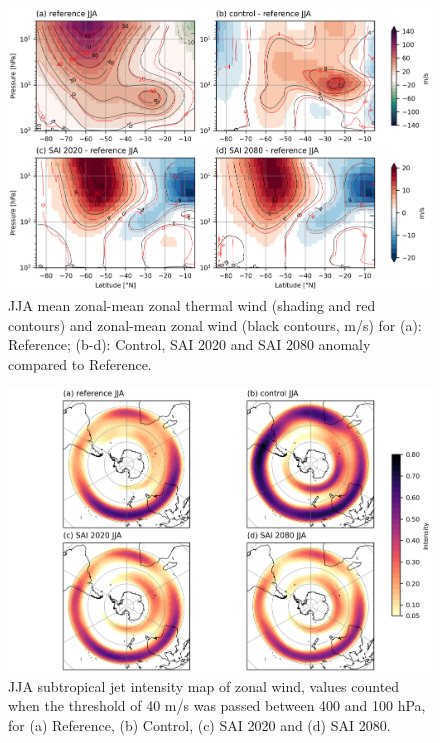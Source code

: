 \begin{figure}[H]
	\centering
	\includegraphics[width=0.95\linewidth]{images/UT_U_zmdiff_JJA.png}
	\caption{JJA mean zonal-mean zonal thermal wind (shading and red contours) and zonal-mean zonal wind (black contours, m/s) for (a): Reference; (b-d): Control, SAI 2020 and SAI 2080 anomaly compared to Reference.}
	\label{fig:UT_U_zmdiff_JJA}
\end{figure}


\begin{figure}[H]
	\centering
	\includegraphics[width=0.95\linewidth]{images/STJ_map_JJA.png}
	\caption{JJA subtropical jet intensity map of zonal wind, values counted when the threshold of 40 m/s was passed between 400 and 100 hPa, for (a) Reference, (b) Control, (c) SAI 2020 and (d) SAI 2080.}
	\label{fig:STJ_map_JJA}
\end{figure}

